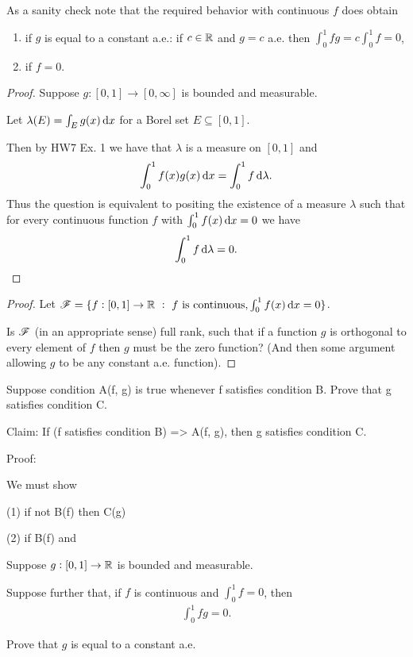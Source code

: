 \begin{remark}
  As a sanity check note that the required behavior with continuous $f$ does obtain
  \begin{enumerate}
  \item if $g$ is equal to a constant a.e.: if $c \in \mathbb{R}$ and $g = c$ a.e. then $\int_0^1 f g = c \int_0^1 f = 0$,
  \item if $f = 0$.
  \end{enumerate}
\end{remark}


\begin{proof}
  Suppose $g: [0, 1] \to [0, \infty]$ is bounded and measurable.

  Let $\lambda(E) = \int_E g(x) \dx$ for a Borel set $E \subseteq [0, 1]$.

  Then by HW7 Ex. 1 we have that $\lambda$ is a measure on $[0, 1]$ and
  \begin{align*}
    \int_0^1 f(x)g(x) \dx = \int_0^1 f \d\lambda.
  \end{align*}
  Thus the question is equivalent to positing the existence of a measure $\lambda$ such that for every
  continuous function $f$ with $\int_0^1 f(x) \dx = 0$ we have
  \begin{align*}
    \int_0^1 f \d\lambda = 0.
  \end{align*}

\end{proof}




\begin{proof}
  Let $\ms F = \{f: [0, 1] \to \R ~:~ f \text{~is continuous}, \int_0^1 f(x) \dx = 0 \}$.

  Is $\mathscr F$ (in an appropriate sense) full rank, such that if a function $g$ is orthogonal to every element
  of $f$ then $g$ must be the zero function? (And then some argument allowing $g$ to be any constant a.e.
  function).
\end{proof}


Suppose condition A(f, g) is true whenever f satisfies condition B. Prove that g satisfies condition C.

Claim: If (f satisfies condition B) => A(f, g), then g satisfies condition C.

Proof:

We must show

(1) if not B(f) then C(g)

(2) if B(f) and


\begin{claim*}
  Suppose $g: [0, 1] \to \mathbb{R}$ is bounded and measurable.

  Suppose further that, if $f$ is continuous and $\int_0^1 f = 0$, then
  \begin{align*}
    \int_0^1 f g = 0.
  \end{align*}

  Prove that $g$ is equal to a constant a.e.
\end{claim*}

